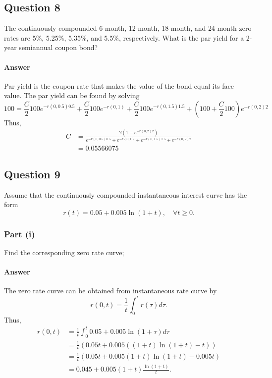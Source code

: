 \subsection{Question 8}
The continuously compounded 6-month, 12-month, 18-month, and 24-month zero
    rates are 5\%, 5.25\%, 5.35\%, and 5.5\%, respectively.
What is the par yield for a 2-year semiannual coupon bond?

\paragraph{Answer}
Par yield is the coupon rate that makes the value of the bond equal its face
    value.
The par yield can be found by solving
\begin{equation*}
    100 = \frac{C}{2} 100 e^{-r(0, 0.5) 0.5} + \frac{C}{2} 100 e^{-r(0, 1)} +
        \frac{C}{2} 100 e^{-r(0, 1.5) 1.5} + \left( 100 + \frac{C}{2} 100
        \right) e^{-r(0, 2) 2}
\end{equation*}
Thus,
\begin{align*}
    C &= \frac{2 (1 - e^{-r(0, 2) 2})}{e^{-r(0, 0.5) 0.5} + e^{-r(0, 1)} +
        e^{-r(0, 1.5) 1.5} + e^{-r(0, 2) 2}} \\
      &= 0.05566075
\end{align*}

\subsection{Question 9}
Assume that the continuously compounded instantaneous interest curve has the
    form
\begin{equation*}
    r(t) = 0.05 + 0.005 \ln (1 + t), \quad \forall t \geq 0.
\end{equation*}

\subsubsection{Part (i)}
Find the corresponding zero rate curve;

\paragraph{Answer}
The zero rate curve can be obtained from instantaneous rate curve by
\begin{equation*}
    r(0, t) = \frac{1}{t} \int_{0}^{t} r(\tau) d\tau.
\end{equation*}
Thus,
\begin{align*}
    r(0, t) &= \frac{1}{t} \int_{0}^{t} 0.05 + 0.005 \ln (1 + \tau) d\tau \\
            &= \frac{1}{t} (0.05 t + 0.005 ((1 + t) \ln(1 + t) - t)) \\
            &= \frac{1}{t} (0.05 t + 0.005 (1 + t) \ln(1 + t) - 0.005 t) \\
            &= 0.045 + 0.005 (1 + t) \frac{\ln (1 + t)}{t}.
\end{align*}

